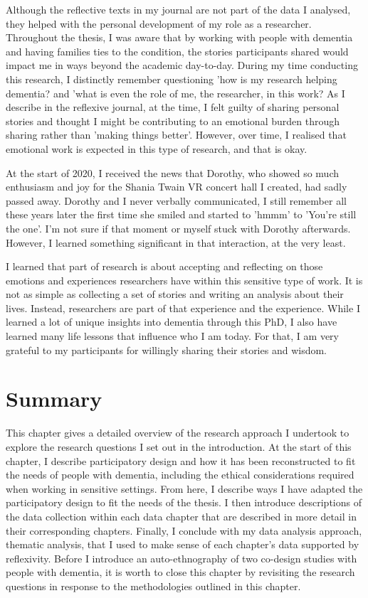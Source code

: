 Although the reflective texts in my journal are not part of the data I analysed, they helped with the personal development of my role as a researcher. Throughout the thesis, I was aware that by working with people with dementia and having families ties to the condition, the stories participants shared would impact me in ways beyond the academic day-to-day. During my time conducting this research, I distinctly remember questioning 'how is my research helping dementia? and 'what is even the role of me, the researcher, in this work? As I describe in the reflexive journal, at the time, I felt guilty of sharing personal stories and thought I might be contributing to an emotional burden through sharing rather than 'making things better'. However, over time, I realised that emotional work is expected in this type of research, and that is okay. 

At the start of 2020, I received the news that Dorothy, who showed so much enthusiasm and joy for the Shania Twain VR concert hall I created, had sadly passed away. Dorothy and I never verbally communicated, I still remember all these years later the first time she smiled and started to 'hmmm' to 'You're still the one'. I'm not sure if that moment or myself stuck with Dorothy afterwards. However, I learned something significant in that interaction, at the very least.

I learned that part of research is about accepting and reflecting on those emotions and experiences researchers have within this sensitive type of work. It is not as simple as collecting a set of stories and writing an analysis about their lives. Instead, researchers are part of that experience and the experience. While I learned a lot of unique insights into dementia through this PhD, I also have learned many life lessons that influence who I am today. For that, I am very grateful to my participants for willingly sharing their stories and wisdom.

\section{Summary}
\label{Method:summary}
This chapter gives a detailed overview of the research approach I undertook to explore the research questions I set out in the introduction. At the start of this chapter, I describe participatory design and how it has been reconstructed to fit the needs of people with dementia, including the ethical considerations required when working in sensitive settings. From here, I describe ways I have adapted the participatory design to fit the needs of the thesis. I then introduce descriptions of the data collection within each data chapter that are described in more detail in their corresponding chapters. Finally, I conclude with my data analysis approach, thematic analysis, that I used to make sense of each chapter's data supported by reflexivity. Before I introduce an auto-ethnography of two co-design studies with people with dementia, it is worth to close this chapter by revisiting the research questions in response to the methodologies outlined in this chapter.

